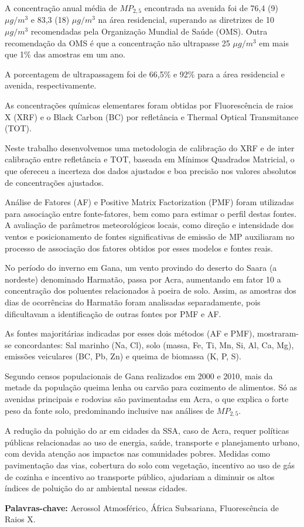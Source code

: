 A concentração anual média de $MP_{2,5}$ encontrada na avenida 
foi de 76,4 (9) $\mu g/m^3$ e 83,3 (18) $\mu g/m^3$ na área residencial, 
superando as diretrizes de 10 $\mu g/m^3$ recomendadas pela 
Organização Mundial de Saúde (OMS). 
Outra recomendação da OMS é que a concentração não ultrapasse 
25 $\mu g/m^3$ em mais que 1\% das amostras em um ano. 

A porcentagem de ultrapassagem foi de 66,5\% e 92\% para 
a área residencial e avenida, respectivamente. 

As concentrações químicas elementares foram obtidas por 
Fluorescência de raios X (XRF) e o Black Carbon (BC) por 
refletância e Thermal Optical Transmitance (TOT). 

Neste trabalho desenvolvemos uma metodologia de calibração do XRF 
e de inter calibração entre refletância e TOT, 
baseada em Mínimos Quadrados Matricial, o que ofereceu a 
incerteza dos dados ajustados e boa precisão nos valores 
absolutos de concentrações ajustados.

Análise de Fatores (AF) e Positive Matrix Factorization (PMF) foram utilizadas
para associação entre fonte-fatores, bem como para estimar o perfil destas fontes. 
A avaliação de parâmetros meteorológicos locais, como direção e intensidade 
dos ventos e posicionamento de fontes significativas de emissão de MP 
auxiliaram no processo de associação dos fatores obtidos por esses modelos e 
fontes reais. 

No período do inverno em Gana, um vento  
provindo do deserto do Saara (a nordeste) denominado Harmatão, 
passa por Acra, aumentando em fator 10 a concentração dos poluentes 
relacionados à poeira de solo. Assim, as amostras dos dias de ocorrências 
do Harmatão foram analisadas separadamente, pois dificultavam a 
identificação de outras fontes por PMF e AF.

As fontes majoritárias indicadas por esses dois métodos (AF e PMF), 
mostraram-se concordantes: Sal marinho (Na, Cl), solo (massa, Fe, Ti, Mn, 
Si, Al, Ca, Mg), emissões veiculares (BC, Pb, Zn) e queima de 
biomassa (K, P, S). 

Segundo censos populacionais de Gana realizados em 2000 e 2010, 
mais da metade da população queima lenha ou carvão para cozimento 
de alimentos. 
Só as avenidas principais e rodovias são pavimentadas em Acra, 
o que explica o forte peso da fonte solo, predominando 
inclusive nas análises de $MP_{2,5}$.

A redução da poluição do ar em cidades da SSA, caso de Acra, 
requer políticas públicas relacionadas ao uso de energia, saúde, 
transporte e planejamento urbano, com devida atenção 
aos impactos nas comunidades pobres. 
Medidas como pavimentação das vias, cobertura do solo com vegetação, 
incentivo ao uso de gás de cozinha e incentivo ao transporte público, 
ajudariam a diminuir os altos índices de poluição do ar ambiental nessas cidades.

\par
\vspace{1em}
\noindent\textbf{Palavras-chave:}  Aerossol Atmosférico, África Subsariana, Fluorescência de Raios X.
